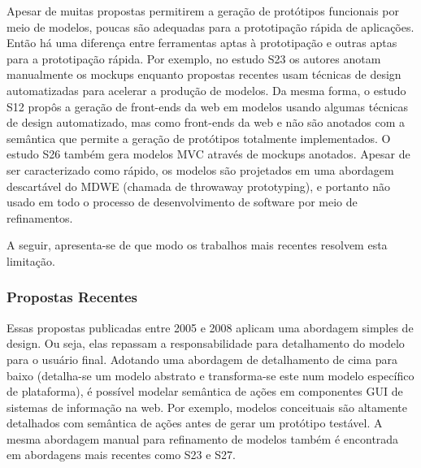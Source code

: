 Apesar de muitas propostas permitirem a geração de protótipos funcionais por meio de modelos, poucas são adequadas para a prototipação rápida de aplicações. Então há uma diferença entre ferramentas aptas à prototipação e outras aptas para a prototipação rápida. Por exemplo, no estudo S23 os autores anotam manualmente os mockups enquanto propostas recentes usam técnicas de design automatizadas para acelerar a produção de modelos. Da mesma forma, o estudo S12 propôs a geração de front-ends da web em modelos usando algumas técnicas de design automatizado, mas como front-ends da web e não são anotados com a semântica que permite a geração de protótipos totalmente implementados. O estudo S26 também gera modelos MVC através de mockups anotados. Apesar de ser caracterizado como rápido, os modelos são projetados em uma abordagem descartável do MDWE (chamada de throwaway prototyping), e portanto não usado em todo o processo de desenvolvimento de software por meio de refinamentos.

A seguir, apresenta-se de que modo os trabalhos mais recentes resolvem esta limitação.


\subsubsection{Propostas Recentes}

Essas propostas publicadas entre 2005 e 2008 aplicam uma abordagem simples de design. Ou seja, elas repassam a responsabilidade para detalhamento do modelo para o usuário final. Adotando uma abordagem de detalhamento de cima para baixo (detalha-se um modelo abstrato e transforma-se este num modelo específico de plataforma), é possível  modelar semântica de ações em componentes GUI de sistemas de informação na web. Por exemplo, modelos conceituais são altamente detalhados com semântica de ações antes de gerar um protótipo testável. A mesma abordagem manual para refinamento de modelos também é encontrada em abordagens mais recentes como S23 e S27. %

